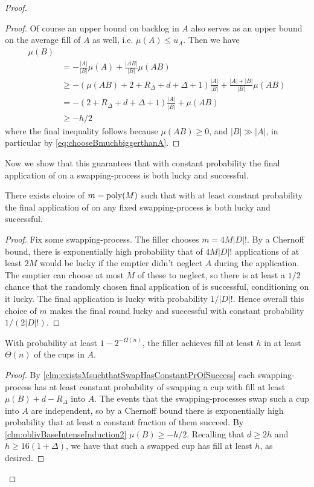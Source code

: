 \begin{proof}
\begin{proof}
  Of course an upper bound on backlog in $A$ also serves as
  an upper bound on the average fill of $A$ as well, i.e. $\mu(A)
  \le u_A$. Then we have 
  \begin{align*}
    \mu(B) &\\
           &= -\frac{|A|}{|B|} \mu(A) + \frac{|A B|}{|B|}\mu(A B) \\
           &\ge -(\mu(AB) + 2+R_\Delta+d + \Delta +1)
           \frac{|A|}{|B|} + \frac{|A|+|B|}{|B|}\mu(AB)\\
           &= -(2+R_\Delta+d + \Delta +1) \frac{|A|}{|B|} + \mu(AB)\\
           &\ge -h/2
  \end{align*}
  where the final inequality follows because $\mu(AB) \ge 0$, and
  $|B|\gg |A|$, in particular by
  \eqref{eq:chooseBmuchbiggerthanA}.

\end{proof}

Now we show that this guarantees that with constant probability
the final application of \randalg on a swapping-process is both
lucky and successful. 
\begin{clm}
  \label{clm:existsMsuchthatSwapHasConstantPrOfSuccess}
  There exists choice of $m = \operatorname{\text{poly}}(M)$ such that with at least
  constant probability the final application of \randalg on any
  fixed swapping-process is both lucky and successful.
\end{clm}
\begin{proof}
  Fix some swapping-process. The filler chooses $m = 4 M |D|!$. By a Chernoff bound, there is
  exponentially high probability that of $4 M |D|!$ applications
  of \randalg at least $2M$ would be lucky if the emptier didn't
  neglect $A$ during the application.
  The emptier can choose at most $M$ of these to neglect, so
  there is at least a $1/2$ chance that the randomly chosen final
  application of \randalg is successful, conditioning on it
  lucky. The final application is lucky with probability
  $1/|D|!$. 
  Hence overall this choice of $m$ makes the final round lucky
  and successful with constant probability $1/(2|D|!)$.
\end{proof}

\begin{clm}
With probability at least $1-2^{-\Omega(n)}$, the filler achieves fill
at least $h$ in at least $\Theta(n)$ of the cups in $A$. 
\end{clm}
\begin{proof}
  By \cref{clm:existsMsuchthatSwapHasConstantPrOfSuccess} each
  swapping-process has at least constant probability of swapping
  a cup with fill at least $\mu(B) + d - R_\Delta$ into $A$. The
  events that the swapping-processes swap such a cup into $A$ are
  independent, so by a Chernoff bound there is exponentially high
  probability that at least a constant fraction of them succeed.
  By \cref{clm:oblivBaseIntenseInduction2} $\mu(B) \ge -h/2$.
  Recalling that $d\ge 2h$ and $h \ge 16(1+\Delta)$, we have that
  such a swapped cup has fill at least $h$, as desired.
\end{proof}


\end{proof}
